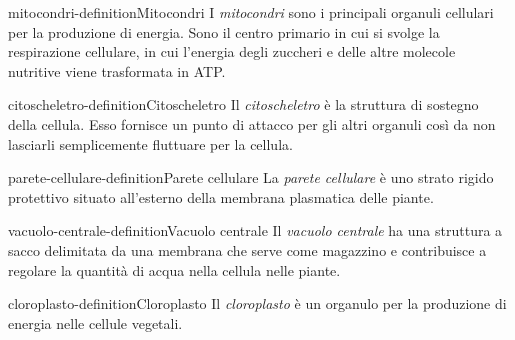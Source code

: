 \documentclass[preview]{standalone}
\begin{document}
\begin{snippetdefinition}{mitocondri-definition}{Mitocondri}
    I \textit{mitocondri} sono i principali organuli cellulari per la produzione di energia.
    Sono il centro primario in cui si svolge la respirazione cellulare, in cui l'energia degli
    zuccheri e delle altre
    molecole nutritive viene trasformata in ATP.
\end{snippetdefinition}


\begin{snippetdefinition}{citoscheletro-definition}{Citoscheletro}
    Il \textit{citoscheletro} è la struttura di sostegno della cellula.
    Esso fornisce un punto di attacco per gli altri organuli così da non 
    lasciarli semplicemente fluttuare per la cellula.
\end{snippetdefinition}



\begin{snippetdefinition}{parete-cellulare-definition}{Parete cellulare}
    La \textit{parete cellulare} è uno strato rigido protettivo situato all'esterno della membrana
    plasmatica delle piante.
\end{snippetdefinition}


\begin{snippetdefinition}{vacuolo-centrale-definition}{Vacuolo centrale}
    Il \textit{vacuolo centrale} ha una struttura a sacco delimitata da una membrana che serve come
    magazzino e contribuisce a regolare la quantità di acqua nella cellula nelle piante.
\end{snippetdefinition}


\begin{snippetdefinition}{cloroplasto-definition}{Cloroplasto}
    Il \textit{cloroplasto} è un organulo per la produzione di
    energia nelle cellule vegetali.
\end{snippetdefinition}
\end{document}
